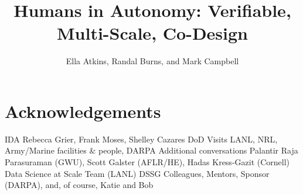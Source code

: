 \documentclass[11pt]{dssg}
\begin{document}
\title{Humans in Autonomy: Verifiable, Multi-Scale, Co-Design}

\author{Ella Atkins, Randal Burns, and Mark Campbell}

\maketitle














%








\section*{Acknowledgements}
IDA
Rebecca Grier, Frank Moses, Shelley Cazares
DoD Visits
LANL, NRL, Army/Marine facilities \& people, DARPA
Additional conversations
Palantir
Raja Parasuraman (GWU), Scott Galster (AFLR/HE), Hadas Kress-Gazit (Cornell)
Data Science at Scale Team (LANL)
DSSG Colleagues, Mentors, Sponsor (DARPA), and, of course, Katie and Bob




\newpage


\normalsize
\end{document}
